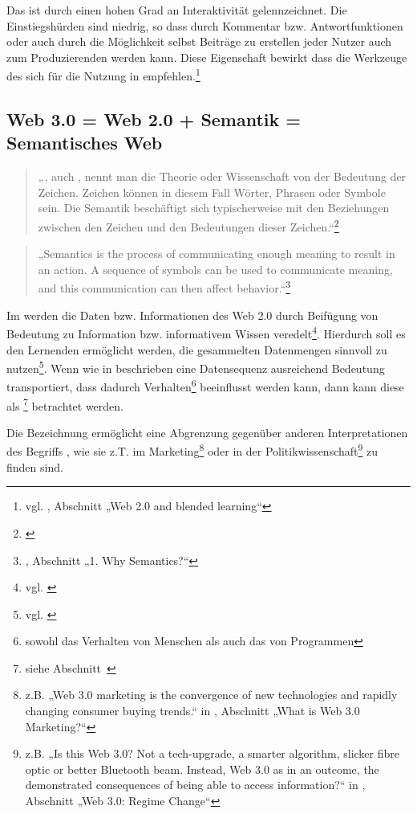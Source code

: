 Das  ist durch einen hohen Grad an Interaktivität gelennzeichnet. Die Einstiegshürden sind niedrig, so dass durch Kommentar bzw. Antwortfunktionen oder auch durch die Möglichkeit selbst Beiträge zu erstellen jeder Nutzer auch zum Produzierenden werden kann. Diese Eigenschaft bewirkt dass die Werkzeuge des  sich für die Nutzung in  empfehlen.\footnote{vgl. \cite{livingston}, Abschnitt „Web 2.0 and blended learning“}

\subsection{Web 3.0 = Web 2.0 + Semantik = Semantisches Web}

\begin{quote}„, auch , nennt man die Theorie oder Wissenschaft von der Bedeutung der Zeichen. Zeichen können in diesem Fall Wörter, Phrasen oder Symbole sein. Die Semantik beschäftigt sich typischerweise mit den Beziehungen zwischen den Zeichen und den Bedeutungen dieser Zeichen.“\footnote{\cite{wp:semantik}}\end{quote}

\begin{quote}„Semantics is the process of communicating enough meaning to result in an action. A sequence of symbols can be used to communicate meaning, and this communication can then affect behavior.“\footnote{\cite{sagaran}, Abschnitt „1. Why Semantics?“}\end{quote}

Im  werden die Daten bzw. Informationen des Web 2.0 durch Beifügung von Bedeutung zu Information bzw. informativem Wissen veredelt\footnote{vgl. \cite{nyt:markoff}}. Hierdurch soll es den Lernenden ermöglicht werden, die gesammelten Datenmengen sinnvoll zu nutzen\footnote{vgl. \cite{tsp:tolksdorf}}. Wenn wie in \cite{sagaran} beschrieben eine Datensequenz ausreichend Bedeutung transportiert, dass dadurch Verhalten\footnote{sowohl das Verhalten von Menschen als auch das von Programmen} beeinflusst werden kann, dann kann diese als \footnote{siehe Abschnitt~} betrachtet werden.

Die Bezeichnung  ermöglicht eine Abgrenzung gegenüber anderen Interpretationen des Begriffs , wie sie z.T. im Marketing\footnote{z.B. „Web 3.0 marketing is the convergence of new technologies and rapidly changing consumer buying trends.“ in \cite{web3market}, Abschnitt „What is Web 3.0 Marketing?“} oder in der Politikwissenschaft\footnote{z.B. „Is this Web 3.0? Not a tech-upgrade, a smarter algorithm, slicker fibre optic or better Bluetooth beam. Instead, Web 3.0 as in an outcome, the demonstrated consequences of being able to access information?“ in \cite{web3pol}, Abschnitt „Web 3.0: Regime Change“} zu finden sind.


